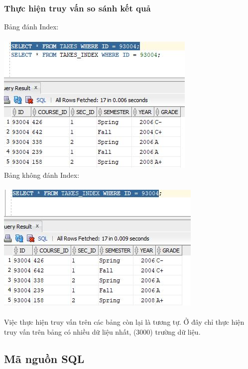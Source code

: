 \documentclass[12pt,a4paper]{report}
\begin{document}
\subsubsection{Thực hiện truy vấn so sánh kết quả}
Bảng đánh Index:\\\\
\includegraphics[scale=1]{kb8o1}\\
Bảng không đánh Index:\\\\
\includegraphics[scale=1]{kb8o2}\\\\
Việc thực hiện truy vấn trên các bảng còn lại là tương tự. Ở đây chỉ thực hiện truy vấn trên bảng có nhiều dữ liệu nhất, (3000) trường dữ liệu.
\subsection{Mã nguồn SQL}
\end{document}
